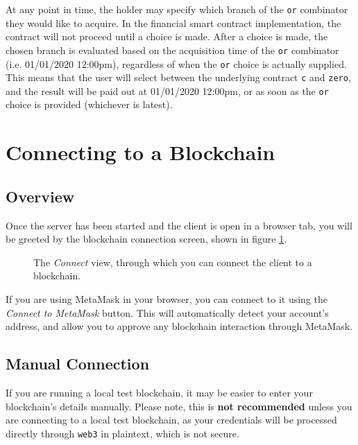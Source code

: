 \documentclass{article}
\begin{document}
At any point in time, the holder may specify which branch of the \texttt{or} combinator they would like to acquire. In the financial smart contract implementation, the contract will not proceed until a choice is made. After a choice is made, the chosen branch is evaluated based on the acquisition time of the \texttt{or} combinator (i.e. 01/01/2020 12:00pm), regardless of when the \texttt{or} choice is actually supplied. \\

This means that the user will select between the underlying contract \texttt{c} and \texttt{zero}, and the result will be paid out at 01/01/2020 12:00pm, or as soon as the \texttt{or} choice is provided (whichever is latest).


\section{Connecting to a Blockchain} \label{UG:connecting}

\subsection{Overview}

Once the server has been started and the client is open in a browser tab, you will be greeted by the blockchain connection screen, shown in figure \ref{UG:fig:connect}.

\begin{figure}[h]
    \centering
    \caption{The \textit{Connect} view, through which you can connect the client to a blockchain.}
    \label{UG:fig:connect}
\end{figure}

If you are using MetaMask in your browser, you can connect to it using the \textit{Connect to MetaMask} button. This will automatically detect your account's address, and allow you to approve any blockchain interaction through MetaMask.


\subsection{Manual Connection}

If you are running a local test blockchain, it may be easier to enter your blockchain's details manually. Please note, this is \textbf{not recommended} unless you are connecting to a local test blockchain, as your credentials will be processed directly through \texttt{web3} in plaintext, which is not secure. \\
\end{document}
